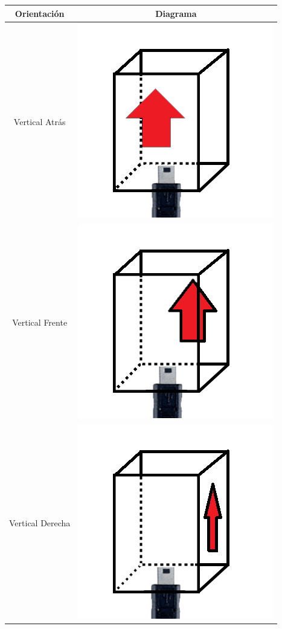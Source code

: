 \documentclass[12pt,a4paper]{article}
\begin{document}
\begin{table}[H]
	\centering
	\begin{tabular}{|c|c|}
		\hline 
		\textbf{Orientación} & \textbf{Diagrama} \\ 
		\hline 
		Vertical Atrás &  \includegraphics[scale=0.2]{images/IMU/verticalatras}\\ 
		\hline 
		Vertical Frente  &  \includegraphics[scale=0.2]{images/IMU/verticalfrente} \\ 
		\hline 
		Vertical Derecha  &  \includegraphics[scale=0.2]{images/IMU/verticalderecha}  \\ 

\end{tabular}
\end{table}
\end{document}
